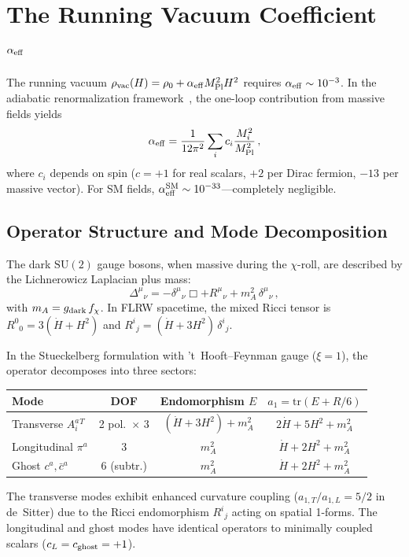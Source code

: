 \documentclass[a4paper,11pt]{article}
\newcommand{\MPl}{M_{\rm Pl}}
\newcommand{\chif}{\chi}
\newcommand{\fchi}{f_\chi}
\newcommand{\SUt}{\mathrm{SU}(2)}
\begin{document}
\section{The Running Vacuum Coefficient $\alpha_{\rm eff}$}
\label{sec:alphaeff}

The running vacuum $\rho_{\rm vac}(H) = \rho_0 + \alpha_{\rm eff}\MPl^2 H^2$ requires $\alpha_{\rm eff} \sim 10^{-3}$. In the adiabatic renormalization framework~\cite{ParkerToms}, the one-loop contribution from massive fields yields
\begin{equation}
\alpha_{\rm eff} = \frac{1}{12\pi^2}\sum_i c_i \frac{M_i^2}{\MPl^2}\,,
\label{eq:alphaeff}
\end{equation}
where $c_i$ depends on spin ($c = +1$ for real scalars, $+2$ per Dirac fermion, $-13$ per massive vector). For SM fields, $\alpha_{\rm eff}^{\rm SM} \sim 10^{-33}$---completely negligible.

\subsection{Operator Structure and Mode Decomposition}

The dark $\SUt$ gauge bosons, when massive during the $\chif$-roll, are described by the Lichnerowicz Laplacian plus mass:
\begin{equation}
\Delta^\mu{}_\nu = -\delta^\mu{}_\nu \Box + R^\mu{}_\nu + m_A^2\,\delta^\mu{}_\nu\,,
\end{equation}
with $m_A = g_{\rm dark}\,\fchi$. In FLRW spacetime, the mixed Ricci tensor is $R^0{}_0 = 3(\dot{H}+H^2)$ and $R^i{}_j = (\dot{H}+3H^2)\,\delta^i{}_j$.

In the Stueckelberg formulation with 't~Hooft--Feynman gauge ($\xi = 1$), the operator decomposes into three sectors:
\begin{center}
\begin{tabular}{lccc}
\toprule
\textbf{Mode} & \textbf{DOF} & \textbf{Endomorphism $E$} & \textbf{$a_1 = \mathrm{tr}(E + R/6)$} \\
\midrule
Transverse $A^a_i{}^T$ & 2 pol.\ $\times$ 3 & $(\dot{H}+3H^2)+m_A^2$ & $2\dot{H}+5H^2+m_A^2$ \\
Longitudinal $\pi^a$ & 3 & $m_A^2$ & $\dot{H}+2H^2+m_A^2$ \\
Ghost $c^a, \bar{c}^a$ & 6 (subtr.) & $m_A^2$ & $\dot{H}+2H^2+m_A^2$ \\
\bottomrule
\end{tabular}
\end{center}
\noindent The transverse modes exhibit enhanced curvature coupling ($a_{1,T}/a_{1,L} = 5/2$ in de~Sitter) due to the Ricci endomorphism $R^i{}_j$ acting on spatial 1-forms. The longitudinal and ghost modes have identical operators to minimally coupled scalars ($c_L = c_{\rm ghost} = +1$).
\end{document}

